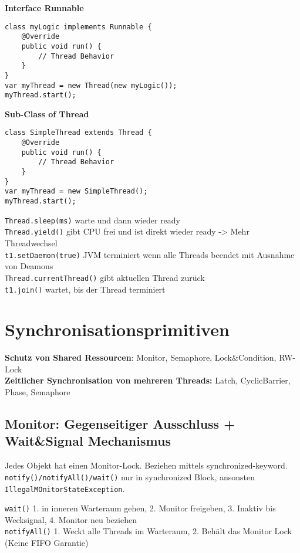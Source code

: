 \begin{minipage}[t]{0.5\linewidth}
\textbf{Interface Runnable}
\begin{lstlisting}[style=java]
class myLogic implements Runnable {
	@Override
	public void run() {
		// Thread Behavior
	}
}
var myThread = new Thread(new myLogic());
myThread.start();
\end{lstlisting}
\end{minipage}
\begin{minipage}[t]{0.5\linewidth}
\textbf{Sub-Class of Thread}
\begin{lstlisting}[style=java]
class SimpleThread extends Thread {
	@Override
	public void run() {
		// Thread Behavior
	}
}
var myThread = new SimpleThread();
myThread.start();
\end{lstlisting}
\end{minipage}

\lstinline|Thread.sleep(ms)| warte und dann wieder ready \\
\lstinline|Thread.yield()| gibt CPU frei und ist direkt wieder ready -> Mehr Threadwechsel \\
\lstinline|t1.setDaemon(true)| JVM terminiert wenn alle Threads beendet mit Ausnahme von Deamons \\
\lstinline|Thread.currentThread()| gibt aktuellen Thread zurück \\
\lstinline|t1.join()| wartet, bis der Thread terminiert

\section{Synchronisationsprimitiven}
\textbf{Schutz von Shared Ressourcen}: Monitor, Semaphore, Lock\&Condition, RW-Lock \\
\textbf{Zeitlicher Synchronisation von mehreren Threads:} Latch, CyclicBarrier, Phase, Semaphore

\subsection{Monitor: Gegenseitiger Ausschluss + Wait\&Signal Mechanismus}
Jedes Objekt hat einen Monitor-Lock. Beziehen mittels synchronized-keyword. \lstinline|notify()/notifyAll()/wait()| nur in synchronized Block, ansonsten \lstinline|IllegalMOnitorStateException|.

\lstinline|wait()| 1. in inneren Warteraum gehen, 2. Monitor freigeben, 3. Inaktiv bis Wecksignal, 4. Monitor neu beziehen \\
\lstinline|notifyAll()| 1. Weckt alle Threads im Warteraum, 2. Behält das Monitor Lock (Keine FIFO Garantie)

